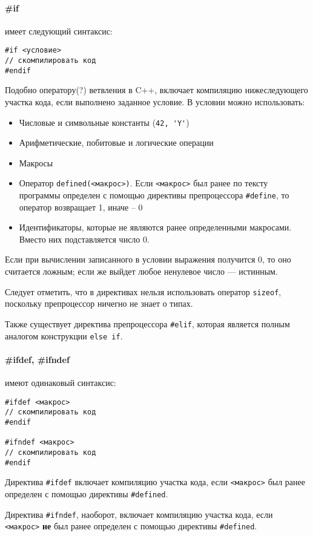 \paragraph{\#if} имеет следующий синтаксис:
\begin{verbatim}
#if <условие>
// скомпилировать код
#endif
\end{verbatim}
Подобно оператору(?) ветвления в C++, включает компиляцию нижеследующего
участка кода, если выполнено заданное условие. В условии можно использовать:
\begin{itemize}
  \item Числовые и символьные константы (\verb|42, 'Y'|)
  \item Арифметические, побитовые и логические операции
  \item Макросы
  \item Оператор \verb|defined(<макрос>)|. Если \verb|<макрос>| был ранее по тексту программы определен с помощью директивы препроцессора
  \verb|#define|, то оператор возвращает 1, иначе -- 0
  \item Идентификаторы, которые не являются ранее определенными макросами. Вместо них подставляется число 0.
\end{itemize}
Если при вычислении записанного в условии выражения получится 0, то оно считается ложным; если же выйдет любое ненулевое число --- истинным.

Следует отметить, что в директивах нельзя использовать оператор \verb|sizeof|, поскольку препроцессор ничегно не знает о типах.

Также существует директива препроцессора \verb|#elif|, которая является полным аналогом конструкции \verb|else if|.

\paragraph{\#ifdef, \#ifndef} имеют одинаковый синтаксис:
\begin{verbatim}
#ifdef <макрос>
// скомпилировать код
#endif

#ifndef <макрос>
// скомпилировать код
#endif
\end{verbatim}

Директива \verb|#ifdef| включает компиляцию участка кода, если \verb|<макрос>| был ранее определен с помощью директивы \verb|#defined|.

Директива \verb|#ifndef|, наоборот, включает компиляцию участка кода, если \verb|<макрос>| \textbf{не} был ранее определен
с помощью директивы \verb|#defined|.

